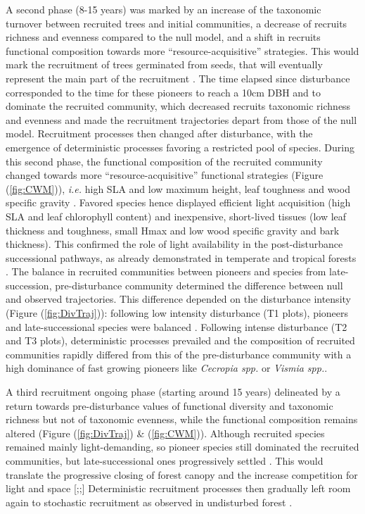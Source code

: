 \documentclass[fleqn,10pt]{ArtEcoFoG} %
\begin{document}
A second phase (8-15 years) was marked by an increase of the taxonomic
turnover between recruited trees and initial communities, a decrease of
recruits richness and evenness compared to the null model, and a shift
in recruits functional composition towards more ``resource-acquisitive''
strategies. This would mark the recruitment of trees germinated from
seeds, that will eventually represent the main part of the recruitment
\citep{Lawton1988}. The time elapsed since disturbance corresponded to
the time for these pioneers to reach a 10cm DBH and to dominate the
recruited community, which decreased recruits taxonomic richness and
evenness and made the recruitment trajectories depart from those of the
null model. Recruitment processes then changed after disturbance, with
the emergence of deterministic processes favoring a restricted pool of
species. During this second phase, the functional composition of the
recruited community changed towards more ``resource-acquisitive''
functional strategies (Figure (\ref{fig:CWM})), \emph{i.e.} high SLA and
low maximum height, leaf toughness and wood specific gravity
\citep{Wright2004, Chave2009b, Herault2011}. Favored species hence
displayed efficient light acquisition (high SLA and leaf chlorophyll
content) and inexpensive, short-lived tissues (low leaf thickness and
toughness, small Hmax and low wood specific gravity and bark thickness).
This confirmed the role of light availability in the post-disturbance
successional pathways, as already demonstrated in temperate and tropical
forests \citep{Pena2008, Carreno2012, Kunstler2016, Both2019}. The
balance in recruited communities between pioneers and species from
late-succession, pre-disturbance community determined the difference
between null and observed trajectories. This difference depended on the
disturbance intensity (Figure (\ref{fig:DivTraj})): following low
intensity disturbance (T1 plots), pioneers and late-successional species
were balanced \citep{Bongers2009}. Following intense disturbance (T2 and
T3 plots), deterministic processes prevailed and the composition of
recruited communities rapidly differed from this of the pre-disturbance
community with a high dominance of fast growing pioneers like
\emph{Cecropia spp.} or \emph{Vismia spp.}.

A third recruitment ongoing phase (starting around 15 years) delineated
by a return towards pre-disturbance values of functional diversity and
taxonomic richness but not of taxonomic evenness, while the functional
composition remains altered (Figure (\ref{fig:DivTraj}) \&
(\ref{fig:CWM})). Although recruited species remained mainly
light-demanding, so pioneer species still dominated the recruited
communities, but late-successional ones progressively settled
\citep{Fortunel2014}. This would translate the progressive closing of
forest canopy and the increase competition for light and space
{[}\citet{Peet1992};\citet{Denslow2000};{]} Deterministic recruitment
processes then gradually left room again to stochastic recruitment as
observed in undisturbed forest \citep{Lawton1988, Chave2004}.
\end{document}

